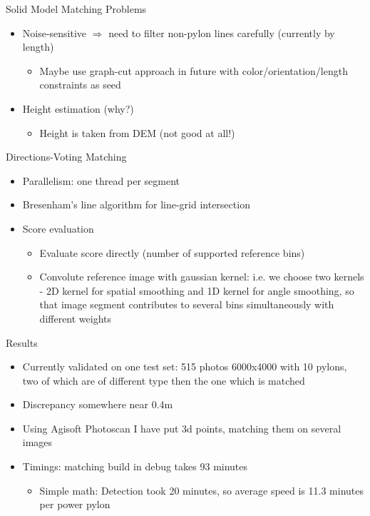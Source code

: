 \documentclass{beamer}
\begin{document}
\begin{frame}[t, fragile]{Solid Model Matching Problems}
\begin{itemize}
\item Noise-sensitive $\Rightarrow$ need to filter non-pylon lines carefully (currently by length)
\begin{itemize}
\item Maybe use graph-cut approach in future with color/orientation/length constraints as seed
\end{itemize}
\item Height estimation (why?)
\begin{itemize}
\item Height is taken from DEM (not good at all!)
\end{itemize}
\end{itemize}
\end{frame}

\begin{frame}[t, fragile]{Directions-Voting Matching}
\begin{itemize}
\item Parallelism: one thread per segment
\item Bresenham's line algorithm for line-grid intersection
\item Score evaluation
\begin{itemize}
\item Evaluate score directly (number of supported reference bins)
\item Convolute reference image with gaussian kernel: i.e. we choose two kernels - 2D kernel for spatial smoothing and 1D kernel for angle smoothing, so that image segment contributes to several bins simultaneously with different weights
\end{itemize}
\end{itemize}
\end{frame}

\begin{frame}[t, fragile]{Results}
\begin{itemize}
\item Currently validated on one test set: 515 photos 6000x4000 with 10 pylons, two of which are of different type then the one which is matched
\item Discrepancy somewhere near 0.4m
\item Using Agisoft Photoscan I have put 3d points, matching them on several images
\item Timings: matching build in debug takes 93 minutes
\begin{itemize}
\item Simple math: Detection took 20 minutes, so average speed is 11.3 minutes per power pylon
\end{itemize}
\end{itemize}
\end{frame}
\end{document}
